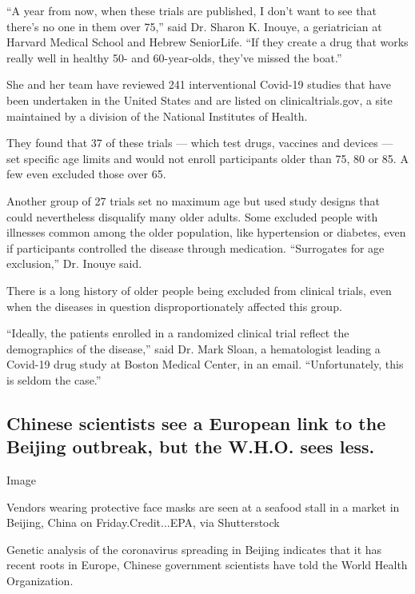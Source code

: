 ``A year from now, when these trials are published, I don't want to see
that there's no one in them over 75,'' said Dr. Sharon K. Inouye, a
geriatrician at Harvard Medical School and Hebrew SeniorLife. ``If they
create a drug that works really well in healthy 50- and 60-year-olds,
they've missed the boat.''

She and her team have reviewed 241 interventional Covid-19 studies that
have been undertaken in the United States and are listed on
clinicaltrials.gov, a site maintained by a division of the National
Institutes of Health.

They found that 37 of these trials --- which test drugs, vaccines and
devices --- set specific age limits and would not enroll participants
older than 75, 80 or 85. A few even excluded those over 65.

Another group of 27 trials set no maximum age but used study designs
that could nevertheless disqualify many older adults. Some excluded
people with illnesses common among the older population, like
hypertension or diabetes, even if participants controlled the disease
through medication. ``Surrogates for age exclusion,'' Dr. Inouye said.

There is a long history of older people being excluded from clinical
trials, even when the diseases in question disproportionately affected
this group.

``Ideally, the patients enrolled in a randomized clinical trial reflect
the demographics of the disease,'' said Dr. Mark Sloan, a hematologist
leading a Covid-19 drug study at Boston Medical Center, in an email.
``Unfortunately, this is seldom the case.''

\hypertarget{chinese-scientists-see-a-european-link-to-the-beijing-outbreak-but-the-who-sees-less}{%
\subsection{Chinese scientists see a European link to the Beijing
outbreak, but the W.H.O. sees
less.}\label{chinese-scientists-see-a-european-link-to-the-beijing-outbreak-but-the-who-sees-less}}

Image

Vendors wearing protective face masks are seen at a seafood stall in a
market in Beijing, China on Friday.Credit...EPA, via Shutterstock

Genetic analysis of the coronavirus spreading in Beijing indicates that
it has recent roots in Europe, Chinese government scientists have told
the World Health Organization.


